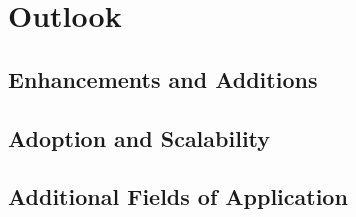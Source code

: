 
\chapter{Outlook}
\label{chp:outlook}

\section{Enhancements and Additions}

\section{Adoption and Scalability}

\section{Additional Fields of Application}

